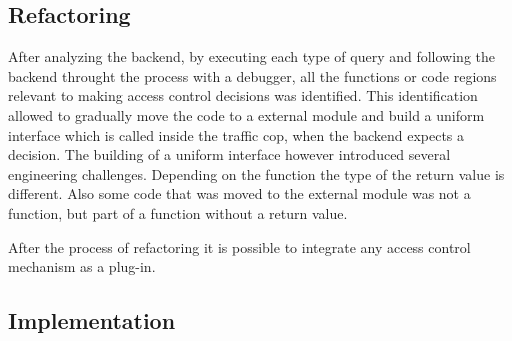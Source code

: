 \subsection{Refactoring}
%
After analyzing the backend, by executing each type of query and following the backend throught the process with a debugger, all the functions or code regions relevant to making access control decisions was identified.
%
This identification allowed to gradually move the code to a external module and build a uniform interface which is called inside the traffic cop, when the backend expects a decision.
%
The building of a uniform interface however introduced several engineering challenges.
%
Depending on the function the type of the return value is different. Also some code that was moved to the external module was not a function, but part of a function without a return value.
%



%
After the process of refactoring it is possible to integrate any access control mechanism as a plug-in.
%

%
\subsection{Implementation}